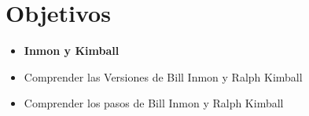 \documentclass[twoside,twocolumn]{article}
\begin{document}


\section{Objetivos}

\begin{itemize}
\item 

\textbf{Inmon y Kimball}
\\
\item Comprender las Versiones de Bill Inmon y Ralph Kimball

\item Comprender los pasos de Bill Inmon y Ralph Kimball
\\



\end{itemize}


\end{document}
